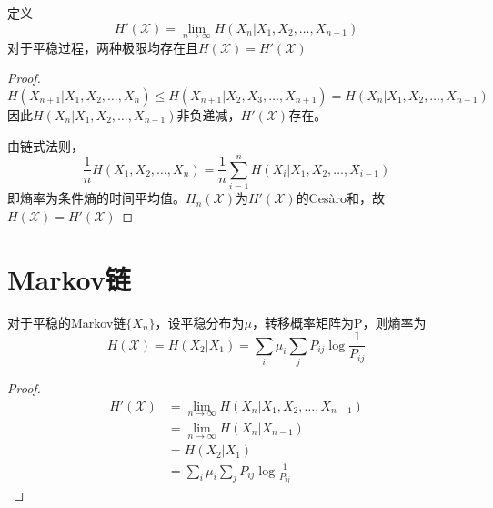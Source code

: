 \documentclass{ctexbook}
\begin{document}
\begin{theorem}\label{thm:entropy_rate}
    定义
    \[H'(\mathcal{X} )= \lim_{n\to \infty} H(X_n|X_{1},X_{2},\ldots,X_{n-1})\]
    对于平稳过程，两种极限均存在且$H(\mathcal{X} ) = H'(\mathcal{X} )$
\end{theorem}
\begin{proof}
    \[H(X_{n+1}|X_{1},X_{2},\ldots,X_{n}) \leq H(X_{n+1}|X_{2},X_{3},\ldots,X_{n+1})=H(X_n|X_{1},X_{2},\ldots,X_{n-1})\]
    因此$H(X_n|X_{1},X_{2},\ldots,X_{n-1})$非负递减，$H'(\mathcal{X})$存在。

    由链式法则，
    \[\frac{1}{n}H(X_1,X_2,\ldots,X_n) = \frac{1}{n}\sum_{i=1}^n H(X_i|X_{1},X_{2},\ldots,X_{i-1})\]
    即熵率为条件熵的时间平均值。$H_n(\mathcal{X} )$为$H'(\mathcal{X} )$的Cesàro和，故$H(\mathcal{X} ) = H'(\mathcal{X} )$
\end{proof}

\section{Markov链}

\begin{theorem}
    对于平稳的Markov链$\{X_n\}$，设平稳分布为$\mu$，转移概率矩阵为P，则熵率为
    \[H(\mathcal{X} ) = H(X_2|X_1) = \sum_{i} \mu_i \sum_{j} P_{ij} \log \frac{1}{P_{ij}}\]
\end{theorem}
\begin{proof}
    \begin{align*}
        H'(\mathcal{X} ) &= \lim_{n\to \infty} H(X_n|X_{1},X_{2},\ldots,X_{n-1}) \\
        &= \lim_{n\to \infty} H(X_n|X_{n-1}) \\
        &= H(X_2|X_1) \\
        &= \sum_{i} \mu_i \sum_{j} P_{ij} \log \frac{1}{P_{ij}}
    \end{align*}
\end{proof}
\end{document}
